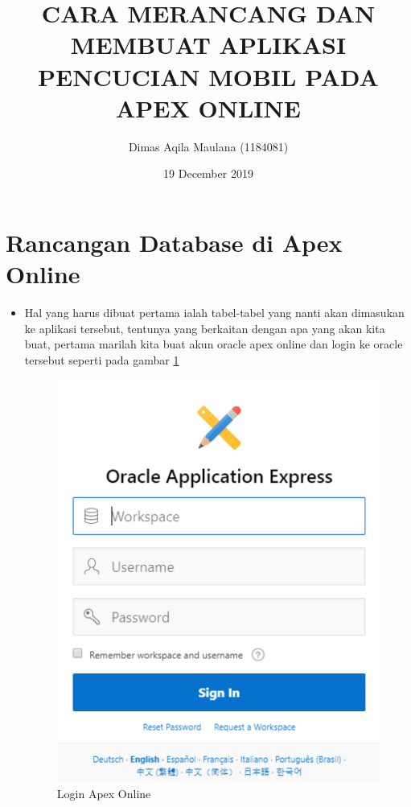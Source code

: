 \documentclass{article}
\title{CARA MERANCANG DAN MEMBUAT APLIKASI PENCUCIAN MOBIL PADA APEX ONLINE}
\author{Dimas Aqila Maulana (1184081)}
\date{19 December 2019}
\begin{document}
\maketitle

\section{Rancangan Database di Apex Online}
\begin{itemize}
\item Hal yang harus dibuat pertama ialah tabel-tabel yang nanti akan dimasukan ke aplikasi tersebut, tentunya yang berkaitan dengan apa yang akan kita buat, pertama marilah kita buat akun oracle apex online dan login ke oracle tersebut seperti pada gambar \ref{login}

\begin{figure}[!htbp]
    \centering
    \includegraphics[scale=0.63]{figures/10.PNG}
    \caption{Login Apex Online}
    \label{login}
\end{figure}


\end{itemize}
\end{document}
